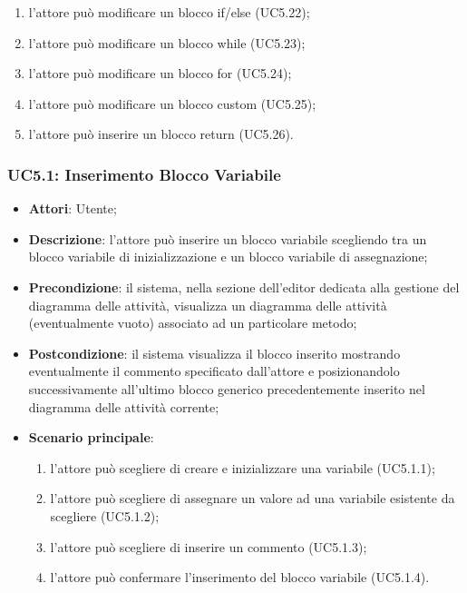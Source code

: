 \begin{itemize}
\begin{itemize}
\begin{itemize}
\begin{itemize}
\begin{itemize}
\begin{enumerate}
		\item l'attore può modificare un blocco if/else (UC5.22);
		\item l'attore può modificare un blocco while (UC5.23);
		\item l'attore può modificare un blocco for (UC5.24);
		\item l'attore può modificare un blocco custom (UC5.25);
		\item l'attore può inserire un blocco return (UC5.26).
	\end{enumerate}
\end{itemize}

\subsubsection{UC5.1: Inserimento Blocco Variabile}
\label{UC5.1}
\begin{itemize}
	\item \textbf{Attori}: Utente;
	\item \textbf{Descrizione}: l'attore può inserire un blocco variabile scegliendo tra un blocco variabile di inizializzazione e un blocco variabile di assegnazione;
	\item \textbf{Precondizione}: il sistema, nella sezione dell'editor dedicata alla gestione del diagramma delle attività, visualizza un diagramma delle attività (eventualmente vuoto) associato ad un particolare metodo;
	\item \textbf{Postcondizione}: il sistema visualizza il blocco inserito mostrando eventualmente il commento specificato dall'attore e posizionandolo successivamente all'ultimo blocco generico precedentemente inserito nel diagramma delle attività corrente;
	\item \textbf{Scenario principale}:
	\begin{enumerate}
		\item l'attore può scegliere di creare e inizializzare una variabile (UC5.1.1);
		\item l'attore può scegliere di assegnare un valore ad una variabile esistente da scegliere (UC5.1.2);
		\item l'attore può scegliere di inserire un commento (UC5.1.3);
		\item l'attore può confermare l'inserimento del blocco variabile (UC5.1.4).
	\end{enumerate}
\end{itemize}


\end{itemize}
\end{itemize}
\end{itemize}
\end{itemize}
